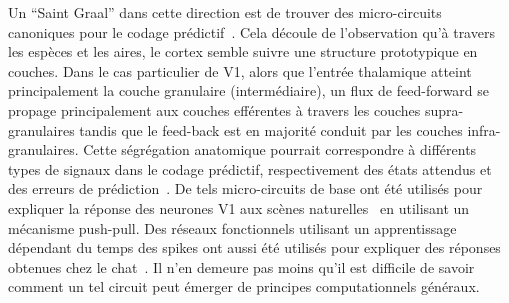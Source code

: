 \documentclass[11pt,french,a4paper,oneside]{article}%
\begin{document}
Un ``Saint Graal'' dans cette direction est de trouver des micro-circuits
canoniques pour le codage prédictif~\citep{Bastos12}. Cela découle
de l'observation qu'à travers les espèces et les aires, le cortex semble
suivre une structure prototypique en couches. Dans le cas particulier de
V1, alors que l'entrée thalamique atteint principalement la couche
granulaire (intermédiaire), un flux de feed-forward se propage
principalement aux couches efférentes à travers les couches
supra-granulaires tandis que le feed-back est en majorité conduit  par les
couches infra-granulaires. Cette ségrégation anatomique pourrait
correspondre à différents types de signaux dans le codage prédictif,
respectivement des états attendus et des erreurs de prédiction~\citep{Bastos12}. De tels micro-circuits de base ont été utilisés pour
expliquer la réponse des neurones V1 aux scènes naturelles~\citep{Kremkow16} en utilisant un mécanisme push-pull. Des réseaux fonctionnels utilisant un apprentissage dépendant du temps des spikes ont aussi été utilisés pour expliquer des réponses obtenues chez le chat~\citep{Ladret19sfn}. Il n'en demeure pas moins
qu'il est difficile de savoir comment un tel circuit peut émerger de principes computationnels généraux.
\end{document}
